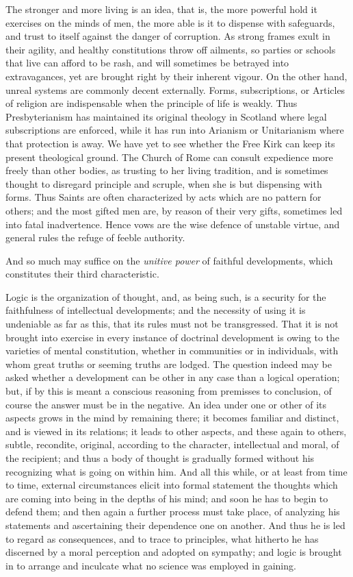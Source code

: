 The stronger and more living is an idea, that is, the
more powerful hold it exercises on the minds of men, the
more able is it to dispense with safeguards, and trust to
itself against the danger of corruption. As strong frames
exult in their agility, and healthy constitutions throw
off ailments, so parties or schools that live can afford
to be rash, and will sometimes be betrayed into
extravagances, yet are brought right by their inherent
vigour. On the other hand, unreal systems are commonly
decent externally. Forms, subscriptions, or Articles of
religion are indispensable when the principle of life is
weakly. Thus Presbyterianism has maintained its original
theology in Scotland where legal subscriptions are
enforced, while it has run into Arianism or Unitarianism
where that protection is away. We have yet to see whether
the Free Kirk can keep its present theological ground.
The Church of Rome can consult expedience more freely
than other bodies, as trusting to her living tradition,
and is sometimes thought to disregard principle and
scruple, when she is but dispensing with forms. Thus
Saints are often characterized by acts which are no
pattern for others; and the most gifted men are, by
reason of their very gifts, sometimes led into fatal
inadvertence. Hence vows are the wise defence of unstable
virtue, and general rules the refuge of feeble authority.

And so much may suffice on the \emph{unitive power} of
faithful developments, which constitutes their third
characteristic.


Logic is the organization of thought, and, as being
such, is a security for the faithfulness of intellectual
developments; and the necessity of using it is undeniable
as far as this, that its rules must not be transgressed.
That it is not brought into exercise in every instance of
doctrinal development is owing to the varieties of mental
constitution, whether in communities or in individuals,
with whom great truths or seeming truths are lodged. The
question indeed may be asked whether a development can be
other in any case than a logical operation; but, if by
this is meant a conscious reasoning from premisses to
conclusion, of course the answer must be in the negative. An idea under one or other of its aspects grows in the
mind by remaining there; it becomes familiar and
distinct, and is viewed in its relations; it leads to
other aspects, and these again to others, subtle,
recondite, original, according to the character,
intellectual and moral, of the recipient; and thus a body
of thought is gradually formed without his recognizing
what is going on within him. And all this while, or at
least from time to time, external circumstances elicit
into formal statement the thoughts which are coming into
being in the depths of his mind; and soon he has to begin
to defend them; and then again a further process must
take place, of analyzing his statements and ascertaining
their dependence one on another. And thus he is led to
regard as consequences, and to trace to principles, what
hitherto he has discerned by a moral perception and
adopted on sympathy; and logic is brought in to arrange
and inculcate what no science was employed in gaining.

